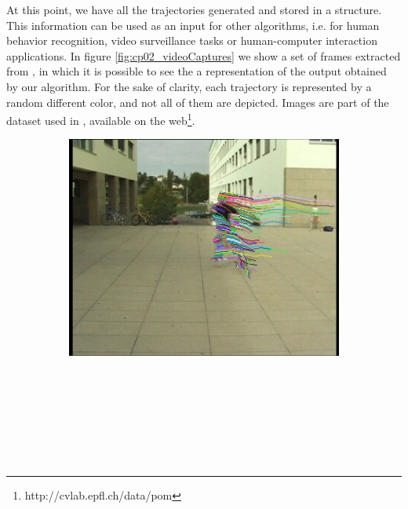 At this point, we have all the trajectories generated and stored in a structure. This information can be used as 
an input for other algorithms, i.e. for human behavior recognition, video surveillance tasks or human-computer 
interaction applications. In figure \ref{fig:cp02_videoCaptures} we show a set of frames extracted from , in which it is possible to see the a representation of the output obtained by our 
algorithm. For the sake of clarity, each trajectory is represented by a random different color, and not all of them 
are depicted. Images are part of the dataset used in \cite{berclaz2011multiple}, available on the 
web\footnote{http://cvlab.epfl.ch/data/pom}.

\begin{figure}[t]
        \centering
        \begin{subfigure}[b]{0.24\textwidth}
                \centering
                \caption{~}
                \includegraphics[width=\textwidth, trim=6 0 5 1, clip]{fig5.jpg}
                \label{fig:cp02_videoCapture1}
        \end{subfigure}%
        ~ %
        \begin{subfigure}[b]{0.24\textwidth}
                \centering
		\caption{~}

\end{subfigure}
\end{figure}
